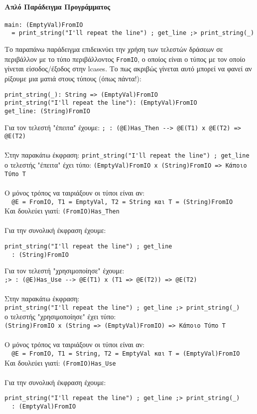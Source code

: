 \documentclass[diploma]{softlab-thesis}
\begin{document}
\paragraph{Απλό Παράδειγμα Προγράμματος}
\begin{verbatim}
main: (EmptyVal)FromIO
  = print_string("I'll repeat the line") ; get_line ;> print_string(_)
\end{verbatim}
Το παραπάνω παράδειγμα επιδεικνύει την χρήση των τελεστών δράσεων σε περιβάλλον
με το τύπο περιβάλλοντος \verb|FromIO|, ο οποίος είναι ο τύπος με τον οποίο
γίνεται είσοδος/έξοδος στην lcases. Το πως ακριβώς γίνεται αυτό μπορεί να φανεί
αν ρίξουμε μια ματιά στους τύπους (όπως πάντα!):
\begin{verbatim}
print_string(_): String => (EmptyVal)FromIO
print_string("I'll repeat the line"): (EmptyVal)FromIO
get_line: (String)FromIO

\end{verbatim}
Για τον τελεστή "έπειτα" έχουμε:
\verb|; : (@E)Has_Then --> @E(T1) x @E(T2) => @E(T2)|
\\\\
Στην παρακάτω έκφραση:
\verb|print_string("I'll repeat the line") ; get_line|
\\
ο τελεστής "έπειτα" έχει τύπο:
\verb|(EmptyVal)FromIO x (String)FromIO => Κάποιο Τύπο Τ|
\\\\
Ο μόνος τρόπος να ταιριάξουν οι τύποι είναι αν:
\\
\verb|  @E = FromIO, T1 = EmptyVal, T2 = String και T = (String)FromIO|
\\
Και δουλεύει γιατί: \verb|(FromIO)Has_Then|
\\\\
Για την συνολική έκφραση έχουμε:
\begin{verbatim}
print_string("I'll repeat the line") ; get_line
  : (String)FromIO

\end{verbatim}
Για τον τελεστή "χρησιμοποίησε" έχουμε:
\\
\verb|;> : (@E)Has_Use --> @E(T1) x (T1 => @E(T2)) => @E(T2)|
\\\\
Στην παρακάτω έκφραση:
\\
\verb|print_string("I'll repeat the line") ; get_line ;> print_string(_)|
\\
ο τελεστής "χρησιμοποίησε" έχει τύπο:
\\
\verb|(String)FromIO x (String => (EmptyVal)FromIO) => Κάποιο Τύπο Τ|
\\\\
Ο μόνος τρόπος να ταιριάξουν οι τύποι είναι αν:
\\
\verb|  @E = FromIO, T1 = String, T2 = EmptyVal και Τ = (EmptyVal)FromIO|
\\
Και δουλεύει γιατί: \verb|(FromIO)Has_Use|
\\\\
Για την συνολική έκφραση έχουμε:
\begin{verbatim}
print_string("I'll repeat the line") ; get_line ;> print_string(_)
  : (EmptyVal)FromIO
\end{verbatim}
\end{document}
